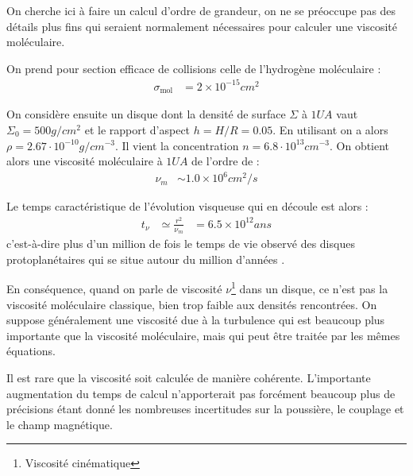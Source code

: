 On cherche ici à faire un calcul d'ordre de grandeur, on ne se préoccupe pas des détails plus fins qui seraient normalement nécessaires pour calculer une viscosité moléculaire. 

On prend pour section efficace de collisions celle de l'hydrogène moléculaire \citep{chapman1970mathematical} :
\begin{align}
\sigma_\text{mol} &= 2\times 10^{-15}\unit{cm^2}
\end{align}

On considère ensuite un disque dont la densité de surface $\Sigma$ à $1\unit{UA}$ vaut $\Sigma_0 = 500\unit{g/cm^2}$ et le rapport d'aspect $h=H/R=0.05$. En utilisant  on a alors $\rho=2.67\cdot 10^{-10}\unit{g/cm^{-3}}$. Il vient la concentration $n=6.8\cdot 10^{13}\unit{cm^{-3}}$. On obtient alors une viscosité moléculaire à $1\unit{UA}$ de l'ordre de : 
\begin{align}
\nu_m &\sim 1.0\times 10^6\unit{cm^2/s}
\end{align}

Le temps caractéristique de l'évolution visqueuse qui en découle est alors : 
\begin{align}
t_\nu &\simeq \frac{r^2}{\nu_m} &= 6.5\times 10^{12}\unit{ans}
\end{align}
c'est-à-dire plus d'un million de fois le temps de vie observé des disques protoplanétaires qui se situe autour du million d'années \citep{williams2011protoplanetary}.

En conséquence, quand on parle de viscosité $\nu$\footnote{Viscosité cinématique} dans un disque, ce n'est pas la viscosité moléculaire classique, bien trop faible aux densités rencontrées. On suppose généralement une viscosité due à la turbulence qui est beaucoup plus importante que la viscosité moléculaire, mais qui peut être traitée par les mêmes équations. 


Il est rare que la viscosité soit calculée de manière cohérente. L'importante augmentation du temps de calcul n'apporterait pas forcément beaucoup plus de précisions étant donné les nombreuses incertitudes sur la poussière, le couplage et le champ magnétique. 

\bigskip

